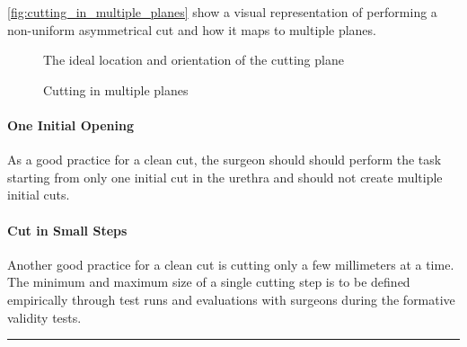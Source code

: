 \autoref{fig:cutting_in_multiple_planes} show a visual representation of performing a non-uniform asymmetrical cut and how it maps to multiple planes.

\begin{figure}
  \centering%
  \hfill%
  \hfill%
  \caption{The ideal location and orientation of the cutting plane}\label{fig:plane_location_orientation}
\end{figure}

\begin{figure}
  \centering%
  \hfill%
  \caption{Cutting in multiple planes}\label{fig:cutting_in_multiple_planes}
\end{figure}

\paragraph{One Initial Opening}\label{par:metric_2}
As a good practice for a clean cut, the surgeon should should perform the task starting from only one initial cut in the urethra and should not create multiple initial cuts.

\paragraph{Cut in Small Steps}\label{par:metric_3}
Another good practice for a clean cut is cutting only a few millimeters at a time. The minimum and maximum size of a single cutting step is to be defined empirically through test runs and evaluations with surgeons during the formative validity tests.

\hrule%

